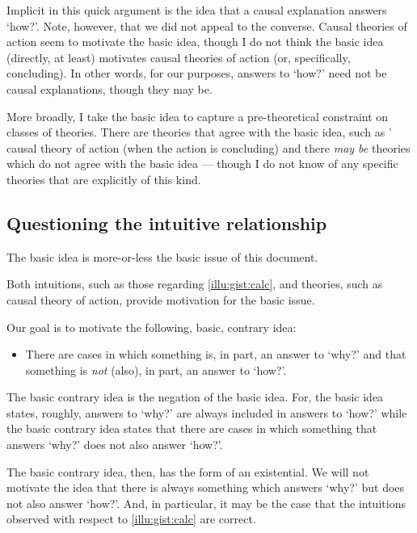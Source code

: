 \begin{note}
  Implicit in this quick argument is the idea that a causal explanation answers `how?'.
  Note, however, that we did not appeal to the converse.
  Causal theories of action seem to motivate the basic idea, though I do not think the basic idea (directly, at least) motivates causal theories of action (or, specifically, concluding).
  In other words, for our purposes, answers to `how?' need not be causal explanations, though they may be.

  More broadly, I take the basic idea to capture a pre-theoretical constraint on classes of theories.
  There are theories that agree with the basic idea, such as \citeauthor{Davidson:1963aa}' causal theory of action (when the action is concluding) and there \emph{may be} theories which do not agree with the basic idea --- though I do not know of any specific theories that are explicitly of this kind.
\end{note}

\subsection{Questioning the intuitive relationship}

\begin{note}
  The basic idea is more-or-less the basic issue of this document.

  Both intuitions, such as those regarding \autoref{illu:gist:calc}, and theories, such as \citeauthor{Davidson:1963aa} causal theory of action, provide motivation for the basic issue.

  Our goal is to motivate the following, basic, contrary idea:

  \begin{itemize}
  \item
    There are cases in which something is, in part, an answer to `why?' and that something is \emph{not} (also), in part, an answer to `how?'.
  \end{itemize}

  The basic contrary idea is the negation of the basic idea.
  For, the basic idea states, roughly, answers to `why?' are always included in answers to `how?' while the basic contrary idea states that there are cases in which something that answers `why?' does not also answer `how?'.

  The basic contrary idea, then, has the form of an existential.
  We will not motivate the idea that there is always something which answers `why?' but does not also answer `how?'.
  And, in particular, it may be the case that the intuitions observed with respect to \autoref{illu:gist:calc} are correct.
\end{note}

